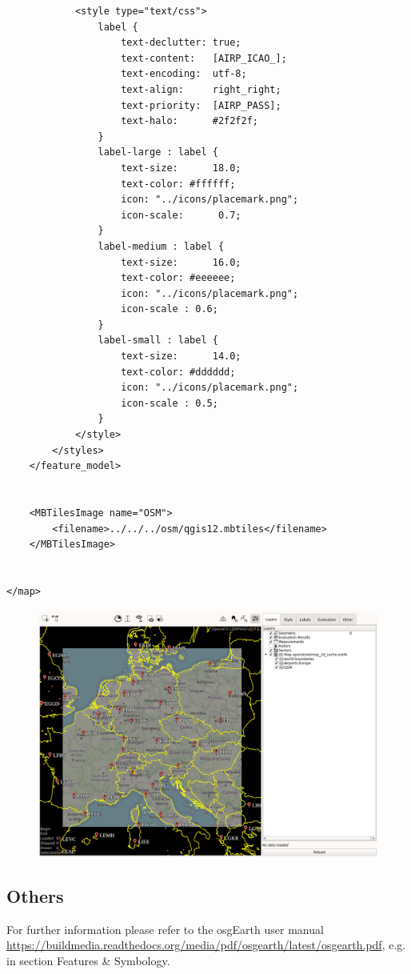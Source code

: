 \begin{lstlisting}
            <style type="text/css">   
                label {
                    text-declutter: true;
                    text-content:   [AIRP_ICAO_];
                    text-encoding:  utf-8;
                    text-align:     right_right;
                    text-priority:  [AIRP_PASS];
                    text-halo:      #2f2f2f;
                }                
                label-large : label {
                    text-size:      18.0;
                    text-color: #ffffff;
                    icon: "../icons/placemark.png";
                    icon-scale:      0.7;
                }
                label-medium : label {
                    text-size:      16.0;
                    text-color: #eeeeee;
                    icon: "../icons/placemark.png";
                    icon-scale : 0.6;
                }           
                label-small : label {
                    text-size:      14.0;
                    text-color: #dddddd;
                    icon: "../icons/placemark.png";
                    icon-scale : 0.5;
                }
            </style>
        </styles>
    </feature_model>
    
    
    <MBTilesImage name="OSM">
        <filename>../../../osm/qgis12.mbtiles</filename>
    </MBTilesImage>

    
</map>

\end{lstlisting}

\begin{figure}[H]
    \hspace*{-2.5cm}
    \includegraphics[width=19cm,frame]{figures/geoview_qgis_osm2.png}
\end{figure}

 
\subsection{Others}

For further information please refer to the osgEarth user manual \url{https://buildmedia.readthedocs.org/media/pdf/osgearth/latest/osgearth.pdf}, e.g. in section Features \& Symbology.
 
